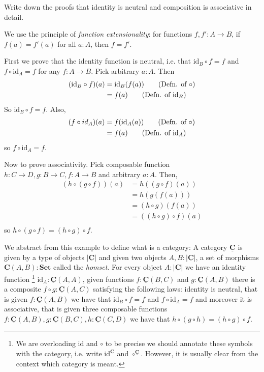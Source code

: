 \documentclass{article}
\newcommand{\Set}{\mathbf{Set}}
\newcommand{\cat}[1]{\underline{\mathbf{#1}}}
\newcommand{\obj}[1]{|#1|}
\newcommand{\homC}[3]{\cat{#1}(#2,#3)}
\newcommand{\id}{\mathrm{id}}
\begin{document}
\begin{Exercise}
  Write down the proofs that identity is neutral and composition is associative in detail.
\end{Exercise}
\begin{Answer}
  We use the principle of \emph{function extensionality}: for functions $f,f':A\to B$, if $f(a)=f'(a)$ for all $a:A$, then $f=f'$.

  First we prove that the identity function is neutral, i.e. that $\id_B\circ f=f$ and $f\circ\id_A=f$ for any $f\colon A\to B$. Pick arbitrary $a:A$. Then
  \begin{align*}
    (\id_B \circ f)(a) 
      &= \id_B(f(a)) \tag{Defn. of $\circ$}\\
      &= f(a) \tag{Defn. of $\id_B$} 
  \end{align*}
  So $\id_B\circ f = f$. Also,
  \begin{align*}
    (f\circ id_A)(a) 
      &= f(\id_A(a)) \tag{Defn. of $\circ$}\\
      &= f(a) \tag{Defn. of $\id_A$} 
  \end{align*}
  so $f\circ\id_A = f$.

  Now to prove associativity. Pick composable function $h : C \to D, g : B \to C, f : A \to B$ and arbitrary $a:A$. Then,
  \begin{align*}
    (h \circ (g \circ f))(a)
      &= h((g\circ f)(a)) \tag{Defn. $\circ$}\\
      &= h(g(f(a))) \tag{Defn. $\circ$}\\
      &= (h\circ g)(f(a)) \tag{Defn. $\circ$}\\
      &= ((h\circ g)\circ f)(a) \tag{Defn. $\circ$}\\
  \end{align*}
  so $h \circ (g \circ f) = (h \circ g) \circ f$.
\end{Answer}

We abstract from this example to define what is a category: A category $\cat{C}$ is given by a type of objects $\obj{\cat{C}}$ and given two objects $A,B: \obj{\cat{C}}$, a set of morphisms $\homC{C}{A}{B} : \Set$ called the \emph{homset}. 
For every object $A : \obj{\cat{C}}$ we have an identity function%
\footnote{We are overloading $\id$ and $\circ$ to be precise we should annotate these symbols with the category, i.e. write $\id^{\cat{C}}$ and $\circ^{\cat{C}}$. However, it is usually clear from the context which category is meant.}
$\id_A : \homC{C}{A}{A}$, given functions $f : \homC{C}{B}{C}$ and $g : \homC{C}{A}{B}$ there is a composite $f \circ g : \homC{C}{A}{C}$ satisfying the following laws: identity is neutral, that is given $f : \cat{C}(A,B)$ we have that $\id_B \circ f = f$ and $f \circ \id_A = f$ and moreover it is associative, that is given three composable functions $f : \homC{C}{A}{B}, g : \homC{C}{B}{C}, h : \homC{C}{C}{D}$ we have that $h \circ (g \circ h) = (h \circ g) \circ f$.
\end{document}
